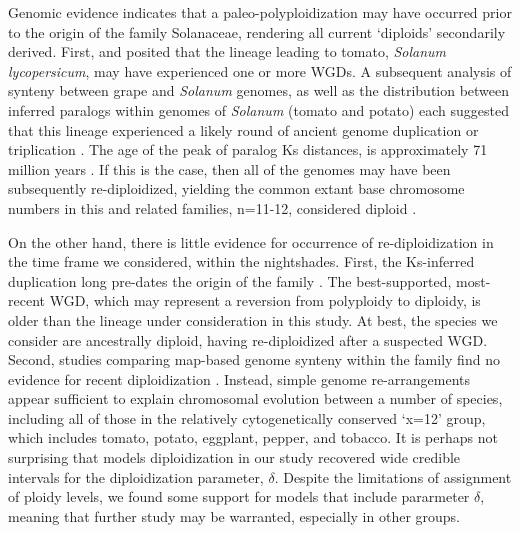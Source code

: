 Genomic evidence indicates that a paleo-polyploidization may have occurred prior to the origin of the family Solanaceae, rendering all current `diploids' secondarily derived. 
First, \citet{ku2000} and \citet{blanc2004} posited that the lineage leading to tomato, \textit{Solanum lycopersicum}, may have experienced one or more WGDs.
A subsequent analysis of synteny between grape and \textit{Solanum} genomes, as well as the distribution between inferred paralogs within genomes of \textit{Solanum} (tomato and potato) each suggested that this lineage experienced a likely round of ancient genome duplication or triplication \citep{tomato2012}. 
The age of the peak of paralog Ks distances, is approximately 71 million years \citep{tomato2012}. 
If this is the case, then all of the genomes may have been subsequently re-diploidized, yielding the common extant base chromosome numbers in this and related families, n=11-12, considered diploid \citep{robertson_2011}. 

On the other hand, there is little evidence for occurrence of re-diploidization in the time frame we considered, within the nightshades.
First, the Ks-inferred duplication long pre-dates the origin of the family \citep{sarkinen_2013}. 
The best-supported, most-recent WGD, which may represent a reversion from polyploidy to diploidy, is older than the lineage under consideration in this study.
At best, the species we consider are ancestrally diploid, having re-diploidized after a suspected WGD.
Second, studies comparing map-based genome synteny within the family find no evidence for recent diploidization \citep{wu_2010a}.
Instead, simple genome re-arrangements appear sufficient to explain chromosomal evolution between a number of species, including all of those in the relatively cytogenetically conserved `x=12' group, which includes tomato, potato, eggplant, pepper, and tobacco.
It is perhaps not surprising that models diploidization in our study recovered wide credible intervals for the diploidization parameter, $\delta$. 
Despite the limitations of assignment of ploidy levels, we found some support for models that include pararmeter $\delta$, meaning that further study may be warranted, especially in other groups.


